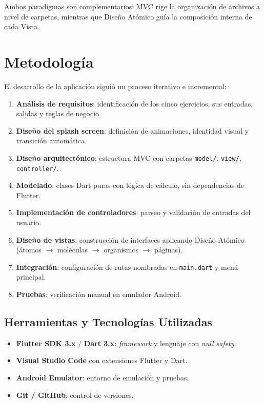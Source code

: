 \documentclass[12pt,a4paper]{article}
\begin{document}
Ambos paradigmas son complementarios: MVC rige la organización de archivos a nivel de carpetas, mientras que Diseño Atómico guía la composición interna de cada Vista.

\section{Metodología}

El desarrollo de la aplicación siguió un proceso iterativo e incremental:

\begin{enumerate}
  \item \textbf{Análisis de requisitos}: identificación de los cinco ejercicios, sus entradas, salidas y reglas de negocio.
  \item \textbf{Diseño del splash screen}: definición de animaciones, identidad visual y transición automática.
  \item \textbf{Diseño arquitectónico}: estructura MVC con carpetas \texttt{model/}, \texttt{view/}, \texttt{controller/}.
  \item \textbf{Modelado}: clases Dart puras con lógica de cálculo, sin dependencias de Flutter.
  \item \textbf{Implementación de controladores}: parseo y validación de entradas del usuario.
  \item \textbf{Diseño de vistas}: construcción de interfaces aplicando Diseño Atómico (átomos $\rightarrow$ moléculas $\rightarrow$ organismos $\rightarrow$ páginas).
  \item \textbf{Integración}: configuración de rutas nombradas en \texttt{main.dart} y menú principal.
  \item \textbf{Pruebas}: verificación manual en emulador Android.
\end{enumerate}

\subsection{Herramientas y Tecnologías Utilizadas}

\begin{itemize}
  \item \textbf{Flutter SDK 3.x} / \textbf{Dart 3.x}: \textit{framework} y lenguaje con \textit{null safety}.
  \item \textbf{Visual Studio Code} con extensiones Flutter y Dart.
  \item \textbf{Android Emulator}: entorno de emulación y pruebas.
  \item \textbf{Git / GitHub}: control de versiones.
\end{itemize}
\end{document}
